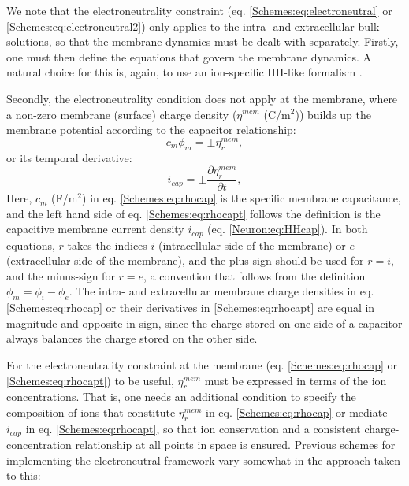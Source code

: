 We note that the electroneutrality constraint (eq. \ref{Schemes:eq:electroneutral} or \ref{Schemes:eq:electroneutral2}) only applies to the intra- and extracellular bulk solutions, so that the membrane dynamics must be dealt with separately. Firstly, one must then define the equations that govern the membrane dynamics. A natural choice for this is, again, to use an ion-specific HH-like formalism \cite{Mori2006, Mori2009, Pods2017, ellingsrud2020}. 

Secondly, the electroneutrality condition does not apply at the membrane, where a non-zero membrane (surface) charge density ($\eta^{mem}$ (C/m$^2$)) builds up the membrane potential according to the capacitor relationship:
\begin{equation}
c_m \phi_{m} = \pm \eta_{r}^{mem},
\label{Schemes:eq:rhocap}
\end{equation}
or its temporal derivative: 
\begin{equation}
i_{cap} = \pm \frac{\partial \eta_{r}^{mem}}{\partial t},
\label{Schemes:eq:rhocapt}
\end{equation}
Here, $c_m$ (F/m$^2$) in eq. \ref{Schemes:eq:rhocap} is the specific membrane capacitance, and the left hand side of eq. \ref{Schemes:eq:rhocapt} follows the definition is the capacitive membrane current density $i_{cap}$  (eq. \ref{Neuron:eq:HHcap}). In both equations, $r$ takes the indices $i$ (intracellular side of the membrane) or $e$ (extracellular side of the membrane), and the plus-sign should be used for $r=i$, and the minus-sign for $r=e$, a convention that follows from the definition $\phi_{m} = \phi_{i} - \phi_{e}$. The intra- and extracellular membrane charge densities in eq. \ref{Schemes:eq:rhocap} or their derivatives in \ref{Schemes:eq:rhocapt} are equal in magnitude and opposite in sign, since the charge stored on one side of a capacitor always balances the charge stored on the other side. 

For the electroneutrality constraint at the membrane (eq. \ref{Schemes:eq:rhocap} or \ref{Schemes:eq:rhocapt}) to be useful, $\eta_{r}^{mem}$ must be expressed in terms of the ion concentrations. That is, one needs an additional condition to specify the composition of ions that constitute $\eta_{r}^{mem}$ in eq. \ref{Schemes:eq:rhocap} or mediate $i_{cap}$ in eq. \ref{Schemes:eq:rhocapt}, so that ion conservation and a consistent charge-concentration relationship  at all points in space is ensured. Previous schemes for implementing the electroneutral framework vary somewhat in the approach taken to this:

